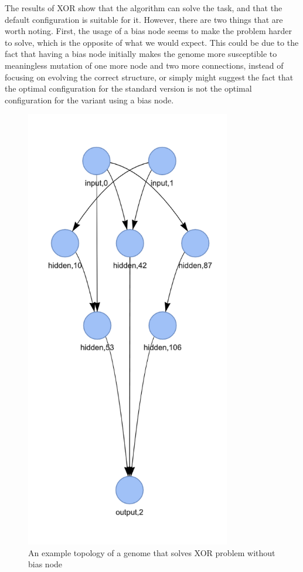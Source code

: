\documentclass{article}
\begin{document}
    The results of XOR show that the algorithm can solve the task, and that the default configuration is suitable for it.
    However, there are two things that are worth noting. First, the usage of a bias node seems to make the problem harder to solve, 
    which is the opposite of what we would expect. This could be due to the fact that having a bias node initially 
    makes the genome more susceptible to meaningless mutation of one more node and two more connections,
    instead of focusing on evolving the correct structure, or simply might suggest the fact that the optimal configuration
    for the standard version is not the optimal configuration for the variant using a bias node.
    \begin{figure}
        \centering
        \includegraphics[width=0.8\textwidth]{xor_topology_example.png}
        \caption{An example topology of a genome that solves XOR problem without bias node }
        \label{fig:xor_bias}
    \end{figure}
\end{document}
